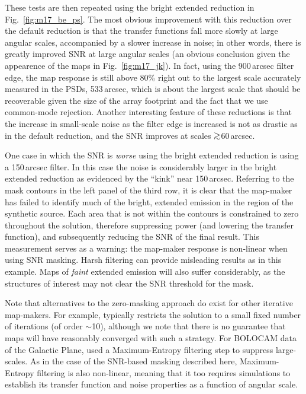 \documentclass[useAMS,usenatbib,nofootinbib]{mn2e}
\def\gsim{\mathrel{\lower2.5pt\vbox{\lineskip=0pt\baselineskip=0pt
          \hbox{$>$}\hbox{$\sim$}}}}
\begin{document}
These tests are then repeated using the bright extended reduction in
Fig.~\ref{fig:m17_be_ps}. The most obvious improvement with this
reduction over the default reduction is that the transfer functions
fall more slowly at large angular scales, accompanied by a slower
increase in noise; in other words, there is greatly improved SNR at
large angular scales (an obvious conclusion given the appearence of
the maps in Fig.~\ref{fig:m17_jk}). In fact, using the 900\,arcsec
filter edge, the map response is still above 80\% right out to the
largest scale accurately measured in the PSDs, 533\,arcsec, which is
about the largest scale that should be recoverable given the size of
the array footprint and the fact that we use common-mode rejection.
Another interesting feature of these reductions is that the increase
in small-scale noise as the filter edge is increased is not as drastic
as in the default reduction, and the SNR improves at scales
$\gsim$60\,arcsec.

One case in which the SNR is \emph{worse} using the bright extended
reduction is using a 150\,arcsec filter. In this case the noise is
considerably larger in the bright extended reduction as evidenced by
the ``kink'' near 150\,arcsec. Referring to the mask contours in the
left panel of the third row, it is clear that the map-maker has failed
to identify much of the bright, extended emission in the region of the
synthetic source. Each area that is not within the contours is
constrained to zero throughout the solution, therefore suppressing
power (and lowering the transfer function), and subsequently reducing
the SNR of the final result. This measurement serves as a warning: the
map-maker response is non-linear when using SNR masking. Harsh
filtering can provide misleading results as in this example. Maps of
\emph{faint} extended emission will also suffer considerably, as the
structures of interest may not clear the SNR threshold for the mask.

Note that alternatives to the zero-masking approach do exist for other
iterative map-makers. For example, \citet{kovacs2008} typically
restricts the solution to a small fixed number of iterations (of order
$\sim$10), although we note that there is no guarantee that maps will
have reasonably converged with such a strategy. For BOLOCAM data of
the Galactic Plane, \citet{aguirre2010} used a Maximum-Entropy
filtering step to suppress large-scales. As in the case of the
SNR-based masking described here, Maximum-Entropy filtering is also
non-linear, meaning that it too requires simulations to establish its
transfer function and noise properties as a function of angular scale.
\end{document}
